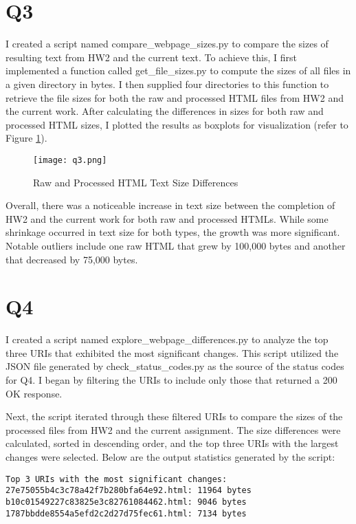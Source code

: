 \documentclass[12pt]{article}
\begin{document}
\section*{Q3}

I created a script named compare\_webpage\_sizes.py to compare the sizes of resulting text from HW2 and the current text. To achieve this, I first implemented a function called get\_file\_sizes.py to compute the sizes of all files in a given directory in bytes. I then supplied four directories to this function to retrieve the file sizes for both the raw and processed HTML files from HW2 and the current work. After calculating the differences in sizes for both raw and processed HTML sizes, I plotted the results as boxplots for visualization (refer to Figure \ref{fig:q3}).

\begin{figure}
    \centering
    \texttt{[image: q3.png]}
    \caption{Raw and Processed HTML Text Size Differences}
    \label{fig:q3}
\end{figure}

Overall, there was a noticeable increase in text size between the completion of HW2 and the current work for both raw and processed HTMLs. While some shrinkage occurred in text size for both types, the growth was more significant. Notable outliers include one raw HTML that grew by 100,000 bytes and another that decreased by 75,000 bytes.


\section*{Q4}

I created a script named explore\_webpage\_differences.py to analyze the top three URIs that exhibited the most significant changes. This script utilized the JSON file generated by check\_status\_codes.py as the source of the status codes for Q4. I began by filtering the URIs to include only those that returned a 200 OK response. 

Next, the script iterated through these filtered URIs to compare the sizes of the processed files from HW2 and the current assignment. The size differences were calculated, sorted in descending order, and the top three URIs with the largest changes were selected. Below are the output statistics generated by the script:

\begin{verbatim}
Top 3 URIs with the most significant changes:
27e75055b4c3c78a42f7b280bfa64e92.html: 11964 bytes
b10c01549227c83825e3c82761084462.html: 9046 bytes
1787bbdde8554a5efd2c2d27d75fec61.html: 7134 bytes
\end{verbatim}
\end{document}
